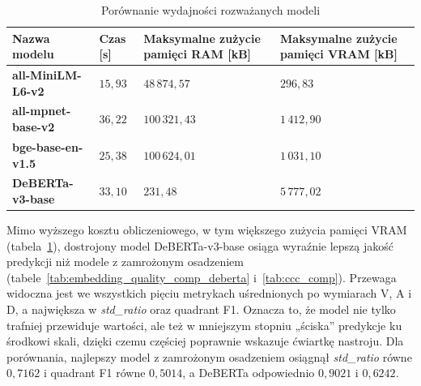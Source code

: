 \begin{table}[htbp]
    \centering
    \caption{Porównanie wydajności rozważanych modeli}
    \begin{tabular}{l l p{3.7cm} p{3.7cm}}
        \toprule
        \textbf{Nazwa modelu} & \textbf{Czas [s]} & \textbf{Maksymalne zużycie pamięci RAM [kB]} & \textbf{Maksymalne zużycie pamięci VRAM [kB]} \\
        \midrule
        \textbf{all-MiniLM-L6-v2}  & $15{,}93$ & $48\,874{,}57$  & $296{,}83$ \\
        \textbf{all-mpnet-base-v2} & $36{,}22$ & $100\,321{,}43$ & $1\,412{,}90$ \\
        \textbf{bge-base-en-v1.5}  & $25{,}38$ & $100\,624{,}01$ & $1\,031{,}10$ \\
        \textbf{DeBERTa-v3-base}   & $33{,}10$ & $231{,}48$      & $5\,777{,}02$ \\
        \bottomrule
    \end{tabular}
    \label{tab:sentece_trans_comp}
\end{table}

Mimo wyższego kosztu obliczeniowego, w tym większego zużycia pamięci VRAM
(tabela~\ref{tab:sentece_trans_comp}), dostrojony model DeBERTa-v3-base osiąga
wyraźnie lepszą jakość predykcji niż modele z zamrożonym osadzeniem
(tabele~\ref{tab:embedding_quality_comp_deberta} i~\ref{tab:ccc_comp}).
Przewaga widoczna jest we wszystkich pięciu metrykach uśrednionych po wymiarach
V, A i D, a największa w \textit{std\_ratio} oraz quadrant F1. Oznacza to, że
model nie tylko trafniej przewiduje wartości, ale też w mniejszym stopniu
„ściska'' predykcje ku środkowi skali, dzięki czemu częściej poprawnie wskazuje
ćwiartkę nastroju. Dla porównania, najlepszy model z zamrożonym osadzeniem
osiągnął \textit{std\_ratio} równe $0{,}7162$ i quadrant F1 równe $0{,}5014$,
a DeBERTa odpowiednio $0{,}9021$ i $0{,}6242$.

